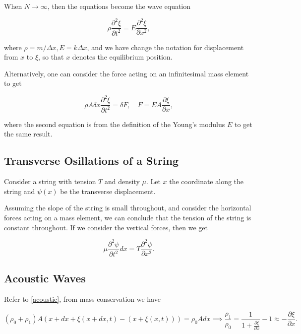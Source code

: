 \documentclass[a4paper,12pt]{report}
\begin{document}
When \(N \to \infty\), then the equations become the wave equation 

\begin{equation}
	\rho \frac{\partial^2 \xi }{\partial t^2} = E \frac{\partial^2 \xi }{\partial x^2},   
\end{equation}

where \(\rho = m /\Delta x, E = k \Delta x \), and we have change the notation for displacement from \(x\) to \(\xi \), so that \(x\) denotes the equilibrium position.   

Alternatively, one can consider the force acting on an infinitesimal mass element to get 

\begin{equation}
	\rho A \delta x \frac{\partial^2 \xi }{\partial t^2} = \delta F , \quad F = EA \frac{\partial \xi }{\partial x}, 
\end{equation}

where the second equation is from the definition of the Young's modulus \(E\) to get the same result.


\subsection{Transverse Osillations of a String}

Consider a string with tension \(T\) and density \(\mu \). Let \(x\) the coordinate along the string and \(\psi (x)\) be the transverse displacement.

Assuming the slope of the string is small throughout, and consider the horizontal forces acting on a mass element, we can conclude that the tension of the string is constant throughout. If we consider the vertical forces, then we get

\begin{equation}
    \mu \frac{\partial ^2\psi }{\partial t^2}dx = T \frac{\partial ^2\psi }{\partial x^2}.   
\end{equation}

\subsection{Acoustic Waves}

Refer to \cref{acoustic}, from mass conservation we have

\begin{equation}
	(\rho _{0}+\rho _{1}  ) A (x+dx+\xi (x+dx,t) - (x+\xi (x,t))) = \rho _{0}Adx \implies \frac{\rho _{1} }{\rho _{0} } = \frac{1}{1+\frac{\partial \xi }{\partial x} }-1 \approx - \frac{\partial \xi }{\partial x}.    
\end{equation}
\end{document}
